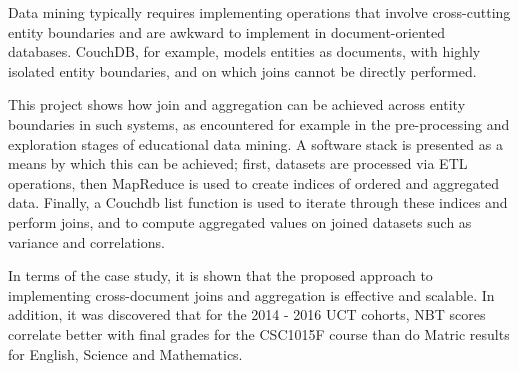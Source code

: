 Data mining typically requires implementing operations that involve cross-cutting entity boundaries and are awkward to implement in document-oriented databases. CouchDB, for example, models entities as documents, with highly isolated entity boundaries, and on which joins cannot be directly performed.

This project shows how join and aggregation can be achieved across entity boundaries in such systems, as encountered for example in the pre-processing and exploration stages of educational data mining. A software stack is presented as a means by which this can be achieved; first, datasets are processed via ETL operations, then MapReduce is used to create indices of ordered and aggregated data. Finally, a Couchdb list function is used to iterate through these indices and perform joins, and to compute aggregated values on joined datasets such as variance and correlations.

In terms of the case study, it is shown that the proposed approach to implementing cross-document joins and aggregation is effective and scalable. In addition, it was discovered that for the 2014 - 2016 UCT cohorts, NBT scores correlate better with final grades for the CSC1015F course than do Matric results for English, Science and Mathematics.